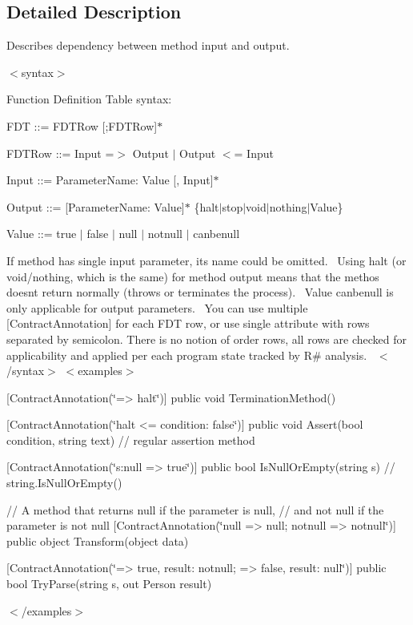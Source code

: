 \subsection{Detailed Description}
Describes dependency between method input and output. 

$<$syntax$>$ 

Function Definition Table syntax\+:


\begin{DoxyItemize}
\item F\+DT \+:\+:= F\+D\+T\+Row \mbox{[};F\+D\+T\+Row\mbox{]}$\ast$ 
\item F\+D\+T\+Row \+:\+:= Input =$>$ Output $\vert$ Output $<$= Input 
\item Input \+:\+:= Parameter\+Name\+: Value \mbox{[}, Input\mbox{]}$\ast$ 
\item Output \+:\+:= \mbox{[}Parameter\+Name\+: Value\mbox{]}$\ast$ \{halt$\vert$stop$\vert$void$\vert$nothing$\vert$\+Value\} 
\item Value \+:\+:= true $\vert$ false $\vert$ null $\vert$ notnull $\vert$ canbenull 
\end{DoxyItemize}If method has single input parameter, it\textquotesingle{}s name could be omitted.~\newline
 Using {\ttfamily halt} (or {\ttfamily void}/{\ttfamily nothing}, which is the same) for method output means that the methos doesn\textquotesingle{}t return normally (throws or terminates the process).~\newline
 Value {\ttfamily canbenull} is only applicable for output parameters.~\newline
 You can use multiple {\ttfamily \mbox{[}Contract\+Annotation\mbox{]}} for each F\+DT row, or use single attribute with rows separated by semicolon. There is no notion of order rows, all rows are checked for applicability and applied per each program state tracked by R\# analysis.~\newline
 $<$/syntax$>$ $<$examples$>$
\begin{DoxyItemize}
\item {\ttfamily  \mbox{[}Contract\+Annotation(\char`\"{}=> halt\char`\"{})\mbox{]} public void Termination\+Method() } 
\item {\ttfamily  \mbox{[}Contract\+Annotation(\char`\"{}halt <= condition\+: false\char`\"{})\mbox{]} public void Assert(bool condition, string text) // regular assertion method } 
\item {\ttfamily  \mbox{[}Contract\+Annotation(\char`\"{}s\+:null => true\char`\"{})\mbox{]} public bool Is\+Null\+Or\+Empty(string s) // string.\+Is\+Null\+Or\+Empty() } 
\item {\ttfamily  // A method that returns null if the parameter is null, // and not null if the parameter is not null \mbox{[}Contract\+Annotation(\char`\"{}null => null; notnull => notnull\char`\"{})\mbox{]} public object Transform(object data) } 
\item {\ttfamily  \mbox{[}Contract\+Annotation(\char`\"{}=> true, result\+: notnull; => false, result\+: null\char`\"{})\mbox{]} public bool Try\+Parse(string s, out Person result) } 
\end{DoxyItemize}$<$/examples$>$ 

